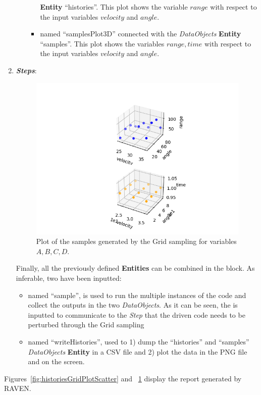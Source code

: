 \begin{enumerate}
\begin{itemize}
\begin{itemize}
      \textbf{Entity} ``histories''.  This plot shows the variable $range$ with respect to the input variables $velocity$ and $angle$.
      \item named ``samplesPlot3D'' connected with the
      \textit{DataObjects} \textbf{Entity} ``samples''. This plot shows the variables $range,time$ with respect to the input variables $velocity$ and $angle$.
    \end{itemize}
  \end{itemize}
   \item \textbf{\textit{Steps}}:
 \begin{figure}[h!]
  \centering
  \includegraphics[scale=0.7]{../../tests/framework/user_guide/ForwardSamplingStrategies/gold/RunDir/Grid/1-samplesPlot3D_scatter-scatter.png}
  \caption{Plot of the samples generated by the Grid sampling for variables $A,B,C,D$.}
  \label{fig:samplesGridPlotScatter}
 \end{figure}
   Finally, all the previously defined \textbf{Entities} can be combined in
   the  block. As inferable,
   two  have been inputted:
   \begin{itemize}
     \item {} named ``sample'', is used to run the multiple
     instances of the code and
     collect the outputs in the two \textit{DataObjects}. As it can be
     seen, the  is inputted to communicate to the
     \textit{Step} that the driven code needs to
     be perturbed through the Grid sampling
     \item  {} named ``writeHistories'', used to 1) dump
     the ``histories'' and ``samples'' \textit{DataObjects}
     \textbf{Entity} in a CSV file and 2) plot the data in the PNG file and
     on the screen.
   \end{itemize}
\end{enumerate}
 Figures~\ref{fig:historiesGridPlotScatter} and ~\ref{fig:samplesGridPlotScatter} display the report generated by RAVEN.

